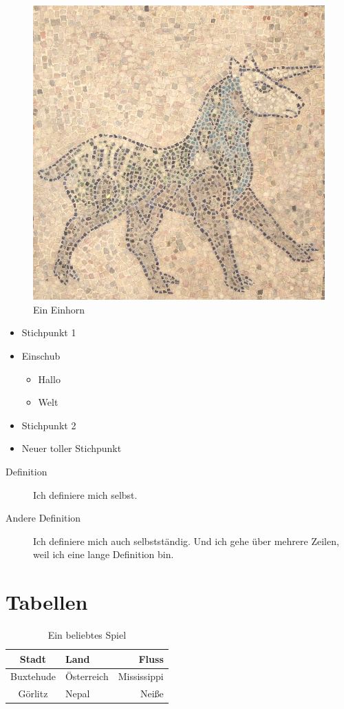 \documentclass[]{scrreprt}
\begin{document}
\begin{figure}[h]
\centering
\includegraphics[scale=0.2]{einhorn.jpg}
\caption{Ein Einhorn}
\label{fig:einhorn}
\end{figure}

\begin{itemize}
\item Stichpunkt 1
\item Einschub
\begin{itemize}
\item Hallo
\item Welt
\end{itemize}

\item Stichpunkt 2
\item Neuer toller Stichpunkt
\end{itemize}

\begin{description}
\item [Definition] Ich definiere mich selbst.
\item [Andere Definition] Ich definiere mich auch selbstständig. Und ich gehe über mehrere Zeilen, weil ich eine lange Definition bin.
\end{description}

\section{Tabellen}
\begin{table}[h]
\centering
\begin{tabular}{|c||l|r|}
\hline
Stadt & Land & Fluss \\
\hline
Buxtehude & Österreich & Mississippi\\
\hline
Görlitz & Nepal & Neiße\\
\hline
\end{tabular}
\caption{Ein beliebtes Spiel}
\label{tab:stadt}
\end{table}
\end{document}
